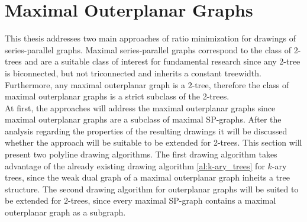 \section{Maximal Outerplanar Graphs}

This thesis addresses two main approaches of ratio minimization for drawings of series-parallel graphs. Maximal series-parallel graphs correspond to the class of 2-trees \cite[P. 2]{straight-line_2-trees} and are a suitable class of interest for fundamental research since any 2-tree is biconnected, but not triconnected and inherits a constant treewidth. Furthermore, any maximal outerplanar graph is a 2-tree, therefore the class of maximal outerplanar graphs is a strict subclass of the 2-trees.\\
At first, the approaches will address the maximal outerplanar graphs since maximal outerplanar graphs are a subclass of maximal SP-graphs. After the analysis regarding the properties of the resulting drawings it will be discussed whether the approach will be suitable to be extended for 2-trees. This section will present two polyline drawing algorithms. The first drawing algorithm takes advantage of the already existing drawing algorithm \ref{al:k-ary_trees} for $k$-ary trees, since the weak dual graph of a maximal outerplanar graph inheits a tree structure. The second drawing algorithm for outerplanar graphs will be suited to be extended for $2$-trees, since every maximal SP-graph contains a maximal outerplanar graph as a subgraph.

